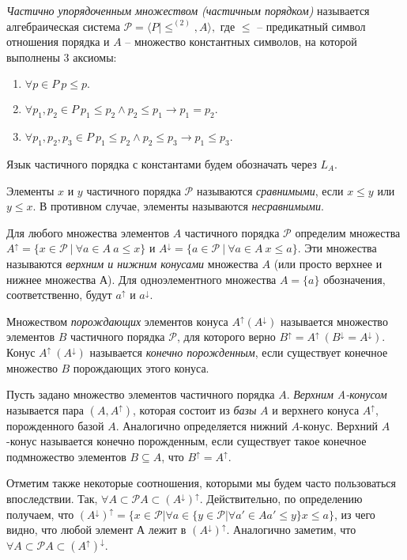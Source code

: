 \documentclass[12pt]{article}
\theoremstyle{break}
\def\P{\mathcal{P}}
\begin{document}
		\textit{Частично упорядоченным множеством (частичным порядком)} называется алгебраическая система $\P = \langle P | \leqslant^{(2)}, A\rangle,$ где $\leqslant$ -- предикатный символ отношения порядка и $A$ -- множество константных символов, на которой выполнены 3 аксиомы:
		\begin{enumerate}
			\item $\forall p\in P\ p\leqslant p.$
			\item $\forall p_1, p_2\in P\ p_1 \leqslant p_2 \wedge p_2 \leqslant p_1 \rightarrow p_1=p_2.$
			\item $\forall p_1, p_2, p_3\in P\ p_1 \leqslant p_2 \wedge p_2 \leqslant p_3 \rightarrow p_1 \leqslant p_3.$
		\end{enumerate}

		Язык частичного порядка с константами будем обозначать через $L_A.$
		
		Элементы $x$ и $y$ частичного порядка $\P$ называются \textit{сравнимыми}, если $x\leqslant y$ или $y\leqslant x.$ В противном случае, элементы называются \textit{несравнимыми}.
	
		Для любого множества элементов $A$ частичного порядка $\P$ определим множества $A^{\uparrow} = \{ x\in\P\ |\ \forall a\in A\ a\leqslant x\}$ и $A^{\downarrow} = \{ a\in\P\ |\ \forall a\in A\ x\leqslant a\}$. Эти множества называются \textit{верхним и нижним конусами} множества $A$ (или просто верхнее и нижнее множества А). Для одноэлементного множества $A=\{a\}$ обозначения, соответственно, будут $a^{\uparrow}$ и $a^{\downarrow}.$

		Множеством \textit{порождающих} элементов конуса $A^{\uparrow}(A^{\downarrow})$ называется множество элементов $B$ частичного порядка $\P$, для которого верно $B^{\uparrow}=A^{\uparrow}~(B^{\downarrow}=A^{\downarrow})$. Конус $A^{\uparrow}~(A^{\downarrow})$ называется \textit{конечно порожденным}, если существует конечное множество $B$ порождающих этого конуса.

		Пусть задано множество элементов частичного порядка $A$. \textit{Верхним A-конусом} называется пара $(A, A^{\uparrow})$, которая состоит из \textit{базы} $A$ и верхнего конуса $A^{\uparrow}$, порожденного базой $A$. Аналогично определяется нижний $A$-конус. Верхний $A$-конус называется конечно порожденным, если существует такое конечное подмножество элементов $B\subseteq A$, что $B^{\uparrow} = A^{\uparrow}$.
		
		Отметим также некоторые соотношения, которыми мы будем часто пользоваться впоследствии. Так, $\forall A\subset \P A\subset (A^{\downarrow})^{\uparrow}$. Действительно, по определению получаем, что $(A^{\downarrow})^{\uparrow} = \{x\in \P | \forall a\in \{y\in \P | \forall a' \in A a' \leqslant y\} x \leqslant a\}$, из чего видно, что любой элемент $А$ лежит в $(A^{\downarrow})^{\uparrow}$. Аналогично заметим, что $\forall A\subset \P A\subset (A^{\uparrow})^{\downarrow}$.
\end{document}
